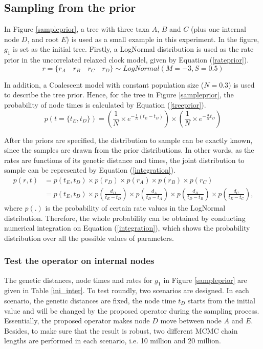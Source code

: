 \documentclass{bmcart}
\begin{document}
\begin{backmatter}
\subsection*{Sampling from the prior}
In Figure \ref{sampleprior}, a tree with three taxa $A$, $B$ and $C$ (plus one internal node $D$, and root $E$) is used as a small example in this experiment. In the figure, $g_1$ is set as the initial tree. Firstly, a LogNormal distribution is used as the rate prior in the uncorrelated relaxed clock model, given by Equation (\ref{rateprior}).
\begin{equation}\label{rateprior}
r = \{{r_A}\quad{r_B}\quad{r_C}\quad{r_D}\} \sim LogNormal(M = -3, S = 0.5)
\end{equation}

In addition, a Coalescent model \cite{pybus2002genie} with constant population size ($N=0.3$) is used to describe the tree prior. Hence, for the tree in Figure \ref{sampleprior}, the probability of node times is calculated by Equation (\ref{treeprior}).
\begin{equation}\label{treeprior}
p(t=\{{t_E},{t_D}\}) = (\frac{1}{N} \times {e^{ - \frac{1}{N}({t_E} - {t_D})}}) \times (\frac{1}{N} \times {e^{ - \frac{3}{N}{t_D}}})
\end{equation}

After the priors are specified, the distribution to sample can be exactly known, since the samples are drawn from the prior distributions. In other words, as the rates are functions of its genetic distance and times, the joint distribution to sample can be represented by Equation (\ref{integration}).
\begin{equation}\label{integration}
\begin{aligned}
p(r,t) &= p({t_E},{t_D}) \times p({r_D}) \times p({r_A}) \times p({r_B}) \times p({r_C}) \\&= p({t_E},{t_D}) \times p(\frac{{{d_D}}}{{t_E} - {t_D}}) \times p(\frac{{{d_A}}}{{t_D} - {t_A}}) \times p(\frac{{{d_B}}}{{t_D} - {t_B}}) \times p(\frac{{{d_C}}}{{t_E} - {t_C}})\text{,}
\end{aligned}
\end{equation}
where $p({.})$ is the probability of certain rate values in the LogNormal distribution. Therefore, the whole probability can be obtained by conducting numerical integration on Equation (\ref{integration}), which shows the probability distribution over all the possible values of parameters.
\subsubsection*{Test the operator on internal nodes}
The genetic distances, node times and rates for $g_1$ in Figure \ref{sampleprior} are given in Table \ref{ini_inter}. To test roundly, two scenarios are designed. In each scenario, the genetic distances are fixed, the node time $t_D$ starts from the initial value and will be changed by the proposed operator during the sampling process. Essentially, the proposed operator makes node $D$ move between node $A$ and $E$. Besides, to make sure that the result is robust, two different MCMC chain lengths are performed in each scenario, i.e. 10 million and 20 million.


\end{backmatter}
\end{document}
